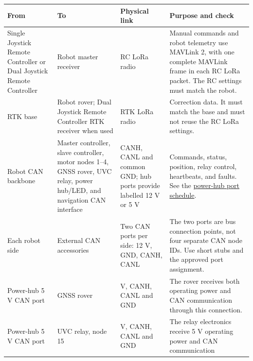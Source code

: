 \documentclass[
  10pt,
  letterpaper,
  openany]{report}
\newcounter{none} %
\begin{document}
{\def\LTcaptype{none} %
\begin{longtable}[]{@{}
  >{\raggedright\arraybackslash}p{}
  >{\raggedright\arraybackslash}p{}
  >{\raggedright\arraybackslash}p{}
  >{\raggedright\arraybackslash}p{}@{}}
\toprule\noalign{}
\begin{minipage}[b]{\linewidth}\raggedright
From
\end{minipage} & \begin{minipage}[b]{\linewidth}\raggedright
To
\end{minipage} & \begin{minipage}[b]{\linewidth}\raggedright
Physical link
\end{minipage} & \begin{minipage}[b]{\linewidth}\raggedright
Purpose and check
\end{minipage} \\
\midrule\noalign{}
\endhead
\bottomrule\noalign{}
\endlastfoot
Single Joystick Remote Controller or Dual Joystick Remote Controller &
Robot master receiver & RC LoRa radio & Manual commands and robot
telemetry use MAVLink 2, with one complete MAVLink frame in each RC LoRa
packet. The RC settings must match the robot. \\
RTK base & Robot rover; Dual Joystick Remote Controller RTK receiver
when used & RTK LoRa radio & Correction data. It must match the base and
must not reuse the RC LoRa settings. \\
Robot CAN backbone & Master controller, slave controller, motor nodes
1--4, GNSS rover, UVC relay, power hub/LED, and navigation CAN interface
& CANH, CANL and common GND; hub ports provide labelled 12 V or 5 V &
Commands, status, position, relay control, heartbeats, and faults. See
the \hyperref[power-hub-ports]{power-hub port schedule}. \\
Each robot side & External CAN accessories & Two CAN ports per side: 12
V, GND, CANH, CANL & The two ports are bus connection points, not four
separate CAN node IDs. Use short stubs and the approved port
assignment. \\
Power-hub 5 V CAN port & GNSS rover & 5 V, CANH, CANL and GND & The
rover receives both operating power and CAN communication through this
connection. \\
Power-hub 5 V CAN port & UVC relay, node 15 & 5 V, CANH, CANL and GND &
The relay electronics receive 5 V operating power and CAN communication

\end{longtable}}
\end{document}
